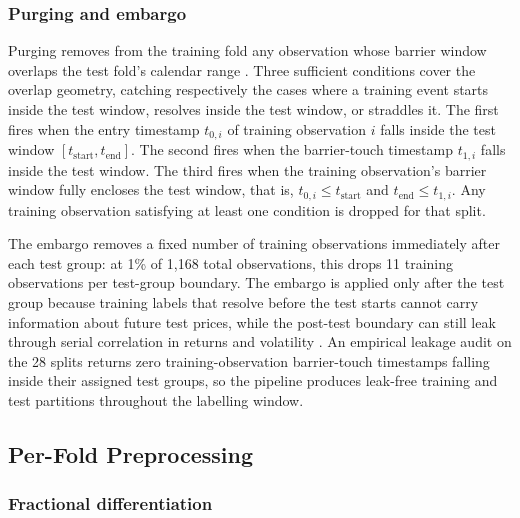 \subsubsection{Purging and embargo}\label{subsubsec:purging_embargo}

Purging removes from the training fold any observation whose barrier window overlaps the test fold's calendar range \citep[Snippet 7.1]{lopez_de_prado_2018}. Three sufficient conditions cover the overlap geometry, catching respectively the cases where a training event starts inside the test window, resolves inside the test window, or straddles it. The first fires when the entry timestamp $t_{0,i}$ of training observation $i$ falls inside the test window $[t_{\text{start}}, t_{\text{end}}]$. The second fires when the barrier-touch timestamp $t_{1,i}$ falls inside the test window. The third fires when the training observation's barrier window fully encloses the test window, that is, $t_{0,i} \leq t_{\text{start}}$ and $t_{\text{end}} \leq t_{1,i}$. Any training observation satisfying at least one condition is dropped for that split.

The embargo removes a fixed number of training observations immediately after each test group: at 1\% of 1,168 total observations, this drops 11 training observations per test-group boundary. The embargo is applied only after the test group because training labels that resolve before the test starts cannot carry information about future test prices, while the post-test boundary can still leak through serial correlation in returns and volatility \citep[Section 7.4.2]{lopez_de_prado_2018}. An empirical leakage audit on the 28 splits returns zero training-observation barrier-touch timestamps falling inside their assigned test groups, so the pipeline produces leak-free training and test partitions throughout the labelling window.


\subsection{Per-Fold Preprocessing}\label{subsec:preprocessing}


\subsubsection{Fractional differentiation}\label{subsubsec:ffd}

